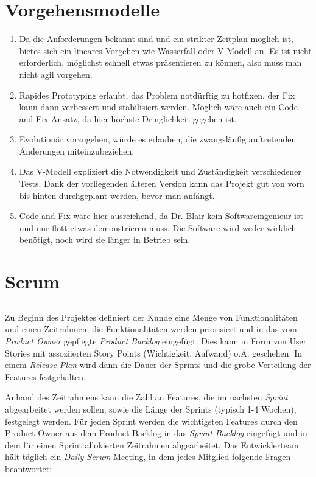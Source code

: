 \documentclass{scrartcl}
\begin{document}
\section{Vorgehensmodelle}
\begin{enumerate}
   \item Da die Anforderungen bekannt sind und ein strikter Zeitplan möglich
      ist, bietes sich ein lineares Vorgehen wie Wasserfall oder V-Modell an.
      Es ist nicht erforderlich, möglichst schnell etwas präsentieren zu können,
      also muss man nicht agil vorgehen.
   \item Rapides Prototyping erlaubt, das Problem notdürftig zu hotfixen, der
      Fix kann dann verbessert und stabilisiert werden. Möglich wäre auch ein
      Code-and-Fix-Ansatz, da hier höchste Dringlichkeit gegeben ist.
   \item Evolutionär vorzugehen, würde es erlauben, die zwangsläufig
      auftretenden Änderungen miteinzubeziehen.
   \item Das V-Modell expliziert die Notwendigkeit und Zuständigkeit
      verschiedener Tests. Dank der vorliegenden älteren Version kann das
      Projekt gut von vorn bis hinten durchgeplant werden, bevor man anfängt.
   \item Code-and-Fix wäre hier ausreichend, da Dr. Blair kein
      Softwareingenieur ist und nur flott etwas demonstrieren muss. Die Software
      wird weder wirklich benötigt, noch wird sie länger in Betrieb sein.
\end{enumerate}

\section{Scrum}

\subsection{}

Zu Beginn des Projektes definiert der Kunde eine Menge von Funktionalitäten und
einen Zeitrahmen; die Funktionalitäten werden priorisiert und in das vom
\emph{Product Owner} gepflegte \emph{Product Backlog} eingefügt. Dies kann in
Form von User Stories mit assoziierten Story Points (Wichtigkeit, Aufwand) o.Ä.
geschehen. In einem \emph{Release Plan} wird dann die Dauer der Sprints und die
grobe Verteilung der Features festgehalten.

Anhand des Zeitrahmens kann die Zahl an Features, die im nächsten
\emph{Sprint} abgearbeitet werden sollen, sowie die Länge der Sprints (typisch
1-4 Wochen), festgelegt werden. Für jeden Sprint werden die wichtigsten Features
durch den Product Owner aus dem Product Backlog in das \emph{Sprint Backlog}
eingefügt und in dem für einen Sprint allokierten Zeitrahmen abgearbeitet. Das
Entwicklerteam hält täglich ein \emph{Daily Scrum} Meeting, in dem jedes Mitglied
folgende Fragen beantwortet:
\end{document}
